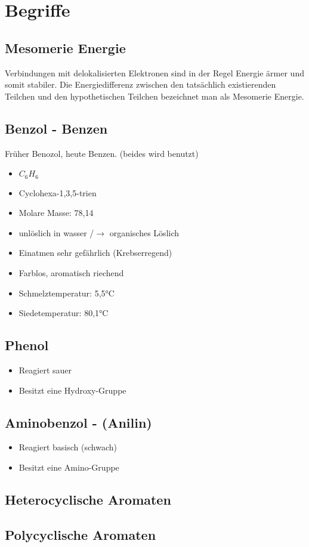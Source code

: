 \section{Begriffe}
\subsection{Mesomerie Energie}
Verbindungen mit delokalisierten Elektronen sind in der 
Regel Energie ärmer und somit stabiler. 
Die Energiedifferenz zwischen den tatsächlich existierenden 
Teilchen und den hypothetischen Teilchen bezeichnet man als 
Mesomerie Energie.

\subsection{Benzol - Benzen}
Früher Benozol, heute Benzen. (beides wird benutzt)
\begin{itemize}
    \item $C_6H_6$
    \item Cyclohexa-1,3,5-trien
    \item Molare Masse: 78,14
    \item unlöslich in wasser /$\rightarrow$ organisches Löslich
    \item Einatmen sehr gefährlich (Krebserregend)
    \item Farblos, aromatisch riechend
    \item Schmelztemperatur: 5,5°C
    \item Siedetemperatur: 80,1°C
\end{itemize}

\subsection{Phenol}
\begin{itemize}
    \item Reagiert sauer
    \item Besitzt eine Hydroxy-Gruppe
\end{itemize}

\subsection{Aminobenzol - (Anilin)}
\begin{itemize}
    \item Reagiert basisch (schwach)
    \item Besitzt eine Amino-Gruppe
\end{itemize}

\subsection{Heterocyclische Aromaten}

\subsection{Polycyclische Aromaten}
